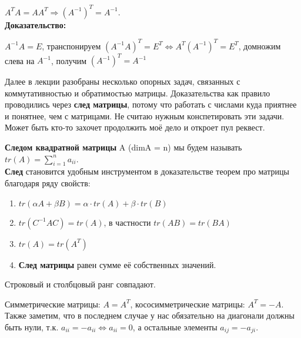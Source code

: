 \documentclass[12pt]{article}
\begin{document}
\begin{theorembox}
$A^T A = A A^T \Rightarrow (A^{-1})^T = A^{-1}$.\\

\textbf{Доказательство:}

$A^{-1}A = E$, транспонируем $(A^{-1}A)^T = E^T \Leftrightarrow A^T (A^{-1})^T = E^T$, домножим слева на $A^{-1}$, получим $(A^{-1})^T = A^{-1}$
\end{theorembox}

Далее в лекции разобраны несколько опорных задач, связанных с коммутативностью и обратимостью матрицы. Доказательства как правило проводились через \textbf{след матрицы}, потому что работать с числами куда приятнее и понятнее, чем с матрицами. Не считаю нужным конспетировать эти задачи. Может быть кто-то захочет продолжить моё дело и откроет пул реквест.

\begin{definitionbox}
    \textbf{Следом квадратной матрицы} A (dimA = n) мы будем называть $tr(A) = \sum_{i = 1}^n a_{ii}$.\\

    \textbf{След} становится удобным инструментом в доказательстве теорем про матрицы благодаря ряду свойств:
    \begin{enumerate}
        \item $tr(\alpha A + \beta B) = \alpha \cdot tr(A) + \beta \cdot tr(B)$
        \item $tr(C^{-1}AC) = tr(A)$, в частности $tr(AB) = tr(BA)$
        \item $tr(A) = tr(A^T)$
        \item \textbf{След матрицы} равен сумме её собственных значений.
    \end{enumerate}
\end{definitionbox}

\begin{remarkbox}
    Строковый и столбцовый ранг совпадают.
\end{remarkbox}

\begin{definitionbox}
    Симметрические матрицы: $A = A^T$, кососимметрические матрицы: $A^T = -A$. Также заметим, что в последнем случае у нас обязательно на диагонали должны быть нули, т.к. $a_{ii} = -a_{ii} \Leftrightarrow a_{ii} = 0$, а остальные элементы $a_{ij} = -a_{ji}$.
\end{definitionbox}
\end{document}
